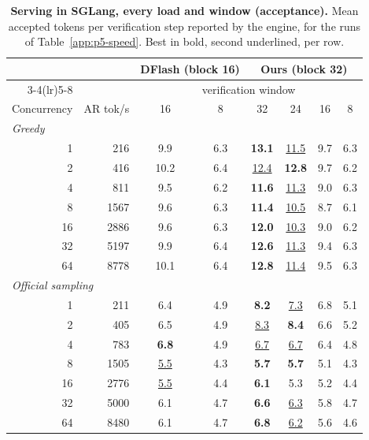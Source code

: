 \begin{table}[t]
\caption{\textbf{Serving in SGLang, every load and window (acceptance).} Mean accepted tokens per verification step reported by the engine, for the runs of Table~\ref{app:p5-speed}. Best in bold, second underlined, per row.}
\label{app:p5-accept}
\centering
\footnotesize
\setlength{\tabcolsep}{1.2pt}
\begin{tabular*}{\columnwidth}{@{\extracolsep{\fill}}rr*{6}{c}@{}}
\toprule
 & & \multicolumn{2}{c}{DFlash (block 16)} & \multicolumn{4}{c}{\textbf{Ours} (block 32)} \\
\cmidrule(lr){3-4}\cmidrule(lr){5-8}
 & & \multicolumn{6}{c}{verification window} \\
Concurrency & AR tok/s & 16 & 8 & 32 & 24 & 16 & 8 \\
\midrule
\multicolumn{8}{l}{\textit{Greedy}} \\
1 & 216 & 9.9 & 6.3 & \textbf{13.1} & \underline{11.5} & 9.7 & 6.3 \\
2 & 416 & 10.2 & 6.4 & \underline{12.4} & \textbf{12.8} & 9.7 & 6.2 \\
4 & 811 & 9.5 & 6.2 & \textbf{11.6} & \underline{11.3} & 9.0 & 6.3 \\
8 & 1567 & 9.6 & 6.3 & \textbf{11.4} & \underline{10.5} & 8.7 & 6.1 \\
16 & 2886 & 9.6 & 6.3 & \textbf{12.0} & \underline{10.3} & 9.0 & 6.2 \\
32 & 5197 & 9.9 & 6.4 & \textbf{12.6} & \underline{11.3} & 9.4 & 6.3 \\
64 & 8778 & 10.1 & 6.4 & \textbf{12.8} & \underline{11.4} & 9.5 & 6.3 \\
\midrule
\multicolumn{8}{l}{\textit{Official sampling}} \\
1 & 211 & 6.4 & 4.9 & \textbf{8.2} & \underline{7.3} & 6.8 & 5.1 \\
2 & 405 & 6.5 & 4.9 & \underline{8.3} & \textbf{8.4} & 6.6 & 5.2 \\
4 & 783 & \textbf{6.8} & 4.9 & \underline{6.7} & \underline{6.7} & 6.4 & 4.8 \\
8 & 1505 & \underline{5.5} & 4.3 & \textbf{5.7} & \textbf{5.7} & 5.1 & 4.3 \\
16 & 2776 & \underline{5.5} & 4.4 & \textbf{6.1} & 5.3 & 5.2 & 4.4 \\
32 & 5000 & 6.1 & 4.7 & \textbf{6.6} & \underline{6.3} & 5.8 & 4.7 \\
64 & 8480 & 6.1 & 4.7 & \textbf{6.8} & \underline{6.2} & 5.6 & 4.6 \\
\bottomrule
\end{tabular*}
\end{table}
